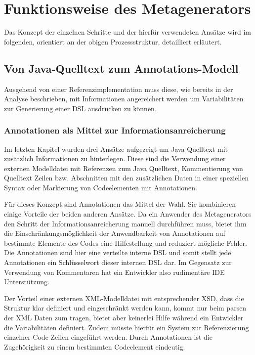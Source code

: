 \documentclass[12pt,oneside,a4paper,parskip]{scrbook}
\begin{document}
\section{Funktionsweise des Metagenerators}

Das Konzept der einzelnen Schritte und der hierfür verwendeten Ansätze wird im folgenden, orientiert an der obigen Prozessstruktur, detailliert erläutert.

\subsection{Von Java-Quelltext zum Annotations-Modell}

Ausgehend von einer Referenzimplementation muss diese, wie bereits in der Analyse beschrieben, mit Informationen angereichert werden um Variabilitäten zur Generierung einer DSL ausdrücken zu können.

\subsubsection{Annotationen als Mittel zur Informationsanreicherung}

Im letzten Kapitel wurden drei Ansätze aufgezeigt um Java Quelltext mit zusätzlich Informationen zu hinterlegen. Diese sind die Verwendung einer externen Modelldatei mit Referenzen zum Java Quelltext, Kommentierung von Quelltext Zeilen bzw. Abschnitten mit den zusätzlichen Daten in einer speziellen Syntax oder Markierung von Codeelementen mit Annotationen.

Für dieses Konzept sind Annotationen das Mittel der Wahl. Sie kombinieren einige Vorteile der beiden anderen Ansätze. Da ein Anwender des Metagenerators den Schritt der Informationsanreicherung manuell durchführen muss, bietet ihm die Einschränkungsmöglichkeit der Anwendbarkeit von Annotationen auf bestimmte Elemente des Codes eine Hilfestellung und reduziert mögliche Fehler. Die Annotationen sind hier eine verteilte interne DSL und somit stellt jede Annotationen ein Schlüsselwort dieser internen DSL dar. Im Gegensatz zur Verwendung von Kommentaren hat ein Entwickler also rudimentäre IDE Unterstützung. 

Der Vorteil einer externen XML-Modelldatei mit entsprechender XSD, dass die Struktur klar definiert und eingeschränkt werden kann, kommt nur beim parsen der XML Daten zum tragen, bietet aber keinerlei Hilfe während ein Entwickler die Variabilitäten definiert. Zudem müsste hierfür ein System zur Referenzierung einzelner Code Zeilen eingeführt werden. Durch Annotationen ist die Zugehörigkeit zu einem bestimmten Codeelement eindeutig.
\end{document}
